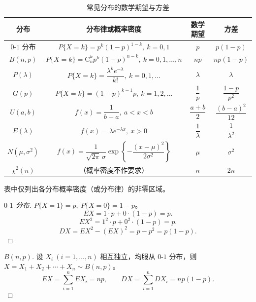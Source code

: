 ﻿\documentclass[lang=cn,11pt]{elegantbook}
\begin{document}
\begin{table}[htbp]
    \centering
    \caption{常见分布的数学期望与方差} \label{tab:common-ev}
    \begin{tabular}{cccc}
        \toprule
        分布 & 分布律或概率密度 & 数学期望 & 方差 \\
        \midrule
        \(0\text{-}1\) 分布 & \(P\{X=k\} = p^k(1-p)^{1-k},\ k=0,1\) & \(p\) & \(p(1-p)\) \\[6pt]
        \(B(n,p)\) & \(P\{X=k\} = \mathrm{C}_n^k p^k(1-p)^{n-k},\ k=0,1,\dots,n\) & \(np\) & \(np(1-p)\) \\[6pt]
        \(P(\lambda)\) & \(P\{X=k\} = \dfrac{\lambda^k e^{-\lambda}}{k!},\ k=0,1,\dots\) & \(\lambda\) & \(\lambda\) \\[6pt]
        \(G(p)\) & \(P\{X=k\} = (1-p)^{k-1}p,\ k=1,2,\dots\) & \(\dfrac{1}{p}\) & \(\dfrac{1-p}{p^2}\) \\[6pt]
        \(U(a,b)\) & \(f(x) = \dfrac{1}{b-a},\ a < x < b\) & \(\dfrac{a+b}{2}\) & \(\dfrac{(b-a)^2}{12}\) \\[6pt]
        \(E(\lambda)\) & \(f(x) = \lambda e^{-\lambda x},\ x > 0\) & \(\dfrac{1}{\lambda}\) & \(\dfrac{1}{\lambda^2}\) \\[6pt]
        \(N(\mu,\sigma^2)\) & \(f(x) = \dfrac{1}{\sqrt{2\pi}\,\sigma}\exp\!\left\{-\dfrac{(x-\mu)^2}{2\sigma^2}\right\}\) & \(\mu\) & \(\sigma^2\) \\[6pt]
        $\chi^2(n)$ & （概率密度不作要求） & \(n\) & \(2n\) \\
        \bottomrule
    \end{tabular}
\end{table}

\begin{note}
表中仅列出各分布概率密度（或分布律）的非零区域。
\end{note}

\begin{proof}[\(0\text{-}1\) 分布]
\(P\{X=1\}=p,\ P\{X=0\}=1-p\)。
\[EX = 1\cdot p + 0\cdot(1-p) = p.\]
\[EX^2 = 1^2\cdot p + 0^2\cdot(1-p) = p.\]
\[DX = EX^2 - (EX)^2 = p - p^2 = p(1-p).\]
\end{proof}

\begin{proof}[\(B(n,p)\)]
设 \(X_i\ (i=1,\dots,n)\) 相互独立，均服从 \(0\text{-}1\) 分布，则 \(X = X_1+X_2+\cdots+X_n \sim B(n,p)\)。
\[EX = \sum_{i=1}^{n}EX_i = np,\qquad DX = \sum_{i=1}^{n}DX_i = np(1-p).\]
\end{proof}
\end{document}
